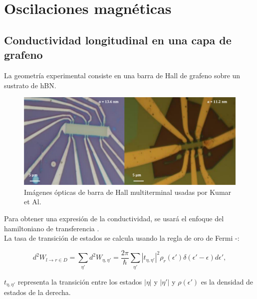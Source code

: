 \section[Oscilaciones]{Oscilaciones magnéticas}
\justifying

\subsection{Conductividad longitudinal en una capa de grafeno}

\begin{frame}
  La geometría experimental consiste en una barra de Hall de grafeno
  sobre un sustrato de hBN.\\

  \begin{figure}[h]
      \centering
      \includegraphics[scale=0.4]{graficas/hall_bar.png}
      \caption{Imágenes ópticas de barra de Hall multiterminal usadas por Kumar et Al. \cite{Kumar2017}}
      \label{Hall_bar}
  \end{figure}
\end{frame}

\begin{frame}
  Para obtener una expresión de la conductividad,
  se usará el enfoque del hamiltoniano de transferencia \cite{Illera2015}.\\
  La tasa de transición de estados se calcula usando la regla de oro de Fermi \cite{Illera2015}-\cite{Sakurai2017}:

  \begin{equation}\label{golden rule}
    d^{2}W_{l\rightarrow r \in D}=\sum_{\eta'}d^{2}W_{\eta,\eta'}=\frac{2\pi}{\hbar}\sum_{\eta'}|t_{\eta,\eta'}|^{2}\rho_{r}(\epsilon')\delta(\epsilon'-\epsilon)d\epsilon',
  \end{equation}

  $t_{\eta,\eta'}$ representa la transición entre los estados $|\eta|$ y $|\eta'|$ y $\rho(\epsilon')$ es la densidad de estados de la derecha.
\end{frame}

